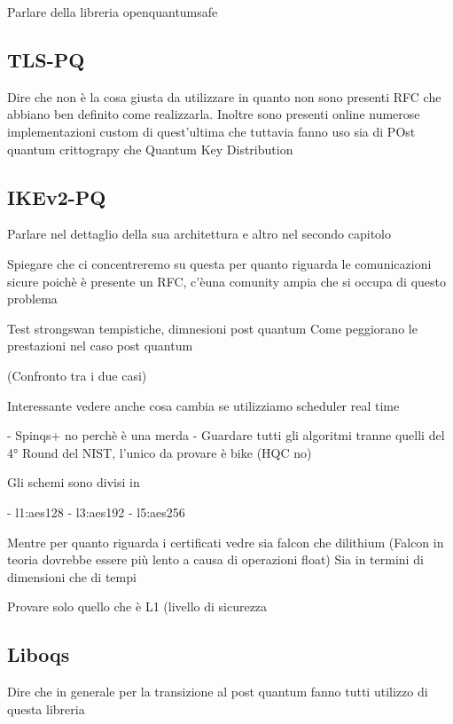 Parlare della libreria openquantumsafe

\subsection{TLS-PQ}

Dire che non è la cosa giusta da utilizzare in quanto non sono presenti RFC che
abbiano ben definito come realizzarla. Inoltre sono presenti online numerose
implementazioni custom di quest'ultima che tuttavia fanno uso sia di POst
quantum crittograpy che Quantum Key Distribution

\subsection{IKEv2-PQ}

Parlare nel dettaglio della sua architettura e altro nel secondo capitolo

Spiegare che ci concentreremo su questa per quanto riguarda le comunicazioni
sicure poichè è presente un RFC, c'èuna comunity ampia che si occupa di questo
problema


Test strongswan tempistiche, dimnesioni post quantum
Come peggiorano le prestazioni nel caso post quantum 

(Confronto tra i due casi)

Interessante vedere anche cosa cambia se utilizziamo scheduler real time

- Spinqs+ no perchè è una merda
- Guardare tutti gli algoritmi tranne quelli del 4° Round del NIST, l'unico da
provare è bike (HQC no)


Gli schemi sono divisi in 

- l1:aes128
- l3:aes192
- l5:aes256

Mentre per quanto riguarda i certificati vedre sia falcon che dilithium
(Falcon in teoria dovrebbe essere più lento a causa di operazioni float)
Sia in termini di dimensioni che di tempi



Provare solo quello che è L1 (livello di sicurezza 


\subsection{Liboqs}

Dire che in generale per la transizione al post quantum fanno tutti utilizzo di
questa libreria
